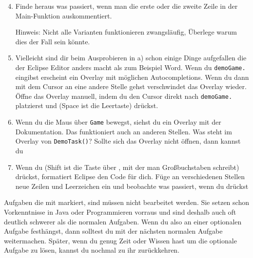 \begin{enumerate} \setcounter{enumi}{3}
    \item Finde heraus was passiert, wenn man die erste oder die zweite Zeile in der Main-Funktion auskommentiert.
    
        Hinweis: Nicht alle Varianten funktionieren zwangsläufig, Überlege warum dies der Fall sein könnte.
    \item Vielleicht sind dir beim Ausprobieren in a) schon einige Dinge aufgefallen die der Eclipse Editor anders macht als zum Beispiel Word.
        Wenn du \lstinline{demoGame.} eingibst erscheint ein Overlay mit möglichen Autocompletions.
        Wenn du dann mit dem Cursor an eine andere Stelle gehst verschwindet das Overlay wieder.
        Öffne das Overlay manuell, indem du den Cursor direkt nach \lstinline{demoGame.} platzierst und  (Space ist die Leertaste) drückst.
    \item
        Wenn du die Maus über \lstinline{Game} bewegst, siehst du ein Overlay mit der Dokumentation.
        Das funktioniert auch an anderen Stellen.
        Was steht im Overlay von \lstinline{DemoTask()}? Sollte sich das Overlay nicht öffnen, dann kannst du 
    \item
        Wenn du  (Shift ist die Taste über , mit der man Großbuchstaben schreibt) drückst, formatiert Eclipse den Code für dich.
        Füge an verschiedenen Stellen neue Zeilen und Leerzeichen ein und beobachte was passiert, wenn du  drückst
\end{enumerate}


\begin{Infobox} 
    Aufgaben die mit \optional markiert, sind müssen nicht bearbeitet werden.
    Sie setzen schon Vorkenntnisse in Java oder Programmieren vorraus und sind deshalb auch oft deutlich schwerer als die normalen Aufgaben.
    Wenn du also an einer optionalen Aufgabe festhängst, dann solltest du mit der nächsten normalen Aufgabe weitermachen.
    Später, wenn du genug Zeit oder Wissen hast um die optionale Aufgabe zu lösen, kannst du nochmal zu ihr zurückkehren.
\end{Infobox}


